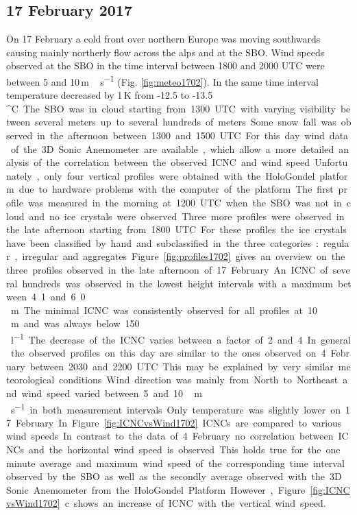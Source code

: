 \documentclass[draft,linenumbers]{agujournal}
\begin{document}
{\subsection{17 February 2017}
On 17 February a cold front over northern Europe was moving southwards causing mainly northerly flow across the alps and at the SBO. Wind speeds observed at the SBO in the time interval between 1800 and 2000 UTC were between 5 and 10\,\si{m\,s^{-1}} (Fig. \ref{fig:meteo1702}).  In the same time interval temperature decreased by 1\,\si{K} from -12.5 to -13.5\,\si{^\circ C}. The SBO was in cloud starting from 1300 UTC with varying visibility between several meters up to several hundreds of meters. Some snow fall was observed in the afternoon between 1300 and 1500 UTC. 

For this day wind data of the 3D Sonic Anemometer are available, which allow a more detailed analysis of the correlation between the observed ICNC and wind speed. Unfortunately, only four vertical profiles were obtained with the HoloGondel platform due to hardware problems with the computer of the platform. The first profile was measured in the morning at 1200 UTC when the SBO was not in cloud and no ice crystals were observed. Three more profiles were observed in the late afternoon starting from 1800 UTC. For these profiles the ice crystals have been classified by hand and subclassified in the three categories: regular, irregular and aggregates.

Figure \ref{fig:profiles1702} gives an overview on the three profiles observed in the late afternoon of 17 February. An ICNC of several hundreds was observed in the lowest height intervals with a maximum between 4.1 and 6.0\,\si{m}. The minimal ICNC was consistently observed for all profiles at 10\,\si{m} and was always below 150\,\si{l^{-1}}. The decrease of the ICNC varies between a factor of 2 and 4. In general the observed profiles on this day are similar to the ones observed on 4 February between 2030 and 2200 UTC. This may be explained by very similar meteorological conditions. Wind direction was mainly from North to Northeast and wind speed varied between 5 and 10 \,\si{m\,s^{-1}} in both measurement intervals. Only temperature was slightly lower on 17 February.

In Figure \ref{fig:ICNCvsWind1702} ICNCs are compared to various wind speeds. In contrast to the data of 4 February no correlation between ICNCs and the horizontal wind speed is observed. This holds true for the one minute average and maximum wind speed of the corresponding time interval observed by the SBO as well as the secondly average observed with the 3D Sonic Anemometer from the HoloGondel Platform. However, Figure \ref{fig:ICNCvsWind1702}c shows an increase of ICNC with the vertical wind speed. 

}
\end{document}
